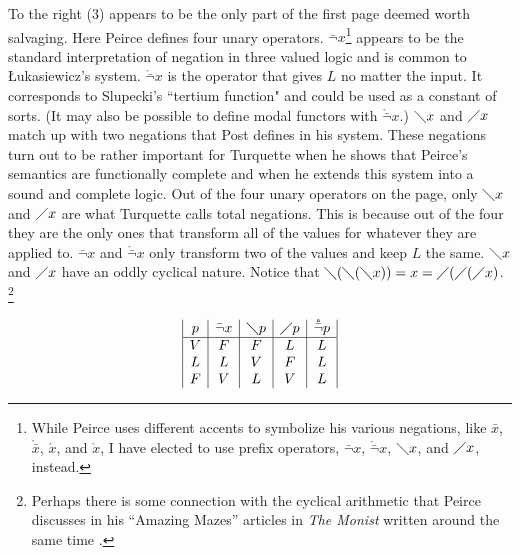 To the right (3) appears to be the only part of the first page deemed worth salvaging. Here Peirce defines four unary operators. $\bar{\lnot}x$\footnote{While Peirce uses different accents to symbolize his various negations, like $\bar{x}$, $\mathring{\bar{x}}$, $\acute{x}$, and $\grave{x}$, I have elected to use prefix operators, $\bar{\lnot}x$,  $\mathring{\bar{\lnot}}x$, $\diagdown{x}$, and $\diagup{x}$, instead.} appears to be the standard interpretation of negation in three valued logic and is common to Łukasiewicz's system. $\mathring{\bar{\lnot}}x$ is the operator that gives $L$ no matter the input. It corresponds to Slupecki's ``tertium function" \citeyearpar{slupecki_volle_1937} and could be used as a constant of sorts. (It may also be possible to define modal functors with $\mathring{\bar{\lnot}}x$.) $\diagdown{x}$ and $\diagup{x}$ match up with two negations that Post defines in his system. These negations turn out to be rather important for Turquette when he shows that Peirce's semantics are functionally complete and when he extends this system into a sound and complete logic. Out of the four unary operators on the page, only $\diagdown{x}$ and $\diagup{x}$ are what Turquette calls total negations. This is because out of the four they are the only ones that transform all of the values for whatever they are applied to. $\bar{\lnot}x$ and $\mathring{\bar{\lnot}}x$ only transform two of the values and keep $L$ the same. $\diagdown{x}$ and $\diagup{x}$ have an oddly cyclical nature. Notice that $\diagdown{}(\diagdown{}(\diagdown{x}))=x=\diagup{}(\diagup{}(\diagup{x})$. \footnote{Perhaps there is some connection with the cyclical arithmetic that Peirce discusses in his ``Amazing Mazes'' articles in \textit{The Monist} written around the same time \citep{peirce_amazing_1908}.}

\begin{displaymath}
\begin{array}{|c|c|c|c|c|}
p & \bar{\lnot}x & \diagdown{p} & \diagup{p} & \mathring{\bar{\lnot}}p\\ %
\hline %
V & F & F & L & L\\
L & L & V & F & L\\
F & V & L & V & L\\
\end{array}
\end{displaymath}

